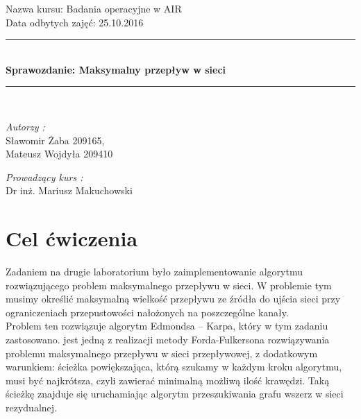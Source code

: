 \documentclass[a4paper,11pt]{article}
\begin{document}
\begin{titlepage}
\begin{center}


{\large Nazwa kursu: Badania operacyjne w AIR}\\[0.5cm]

{\large Data odbytych zajęć: 25.10.2016}\\[0.5cm]

\rule{\linewidth}{0.5mm} \\[0.4cm]
{ \huge \bfseries Sprawozdanie: Maksymalny przepływ w sieci \\[0.4cm] }
\rule{\linewidth}{0.5mm} \\[1.5cm]

\noindent
\begin{minipage}{0.4\textwidth}
  \begin{flushleft} \large
    \emph{Autorzy :}\\
    Sławomir Żaba 209165,\\
    Mateusz Wojdyła 209410 \\
  \end{flushleft}
\end{minipage}%
\begin{minipage}{0.4\textwidth}
  \begin{flushright} \large
    \emph{Prowadzący kurs :} \\
    Dr inż. Mariusz Makuchowski \\
  \end{flushright}
\end{minipage}
\end{center}
\end{titlepage}
\section{Cel ćwiczenia}
    Zadaniem na drugie laboratorium było zaimplementowanie algorytmu rozwiązującego problem maksymalnego przepływu w sieci. W problemie tym musimy określić maksymalną wielkość przepływu ze źródła do ujścia sieci przy ograniczeniach przepustowości nałożonych na poszczególne kanały. \\
    Problem ten rozwiązuje algorytm Edmondsa – Karpa, który w tym zadaniu zastosowano. jest jedną z realizacji metody Forda-Fulkersona rozwiązywania problemu maksymalnego przepływu w sieci przepływowej, z dodatkowym warunkiem: ścieżka powiększająca, którą szukamy w każdym kroku algorytmu, musi być najkrótsza, czyli zawierać minimalną możliwą ilość krawędzi. Taką ścieżkę znajduje się uruchamiając algorytm przeszukiwania grafu wszerz w sieci rezydualnej.
    
\end{document}
